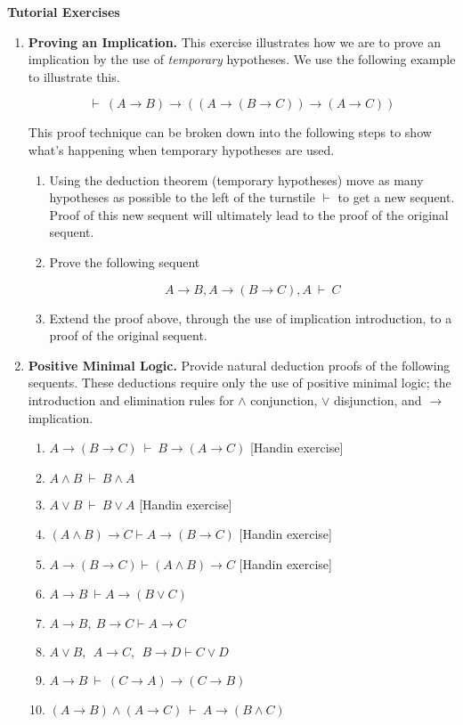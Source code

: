 \documentclass[11pt]{report}
\begin{document}
\newpage
{\bf Tutorial Exercises}
\begin{enumerate}

	\item \textbf{Proving an Implication.} This exercise illustrates how we are to prove an implication by the use of \emph{temporary} hypotheses. We use the following example to illustrate this.
	
	$$\vdash \ (A \to B) \to ((A \to (B \to C)) \to (A \to C))$$

	This proof technique can be broken down into the following steps to show what's happening when temporary hypotheses are used. 

	\begin{enumerate}

		\item Using the deduction theorem (temporary hypotheses) move as many hypotheses as possible to the left of the turnstile $\vdash$ to get a new sequent. Proof of this new sequent will ultimately lead to the proof of the original sequent. 

		\item Prove the following sequent 
		
		$$ A \to B, A \to (B \to C), A \ \vdash \ C$$

		\item Extend the proof above, through the use of implication introduction, to a proof of the original sequent.

	\end{enumerate}
	
	\item \textbf{Positive Minimal Logic.} Provide natural deduction proofs of the following sequents. These deductions require only the use of positive minimal logic; the introduction and elimination rules for $\land$ conjunction, $\lor$ disjunction, and $\to$ implication. 
	 
	\begin{enumerate}
		\item $A \to (B \to C) \ \vdash \ B \to (A \to C)$ \hfill [Handin exercise]
		\item $A \land B \ \vdash \ B \land A$
		\item $A \lor B \ \vdash \ B \lor A$ \hfill [Handin exercise]
		\item $( A\land  B) \rightarrow  C \vdash  A\rightarrow ( B \rightarrow  C) $ \hfill [Handin exercise]
		\item $A \rightarrow ( B \rightarrow  C) \vdash ( A\land  B) \rightarrow C$	 \hfill [Handin exercise]
		\item $A \to B \ \vdash A \to (B \lor C)$
		\item $ A\rightarrow  B, \  B \rightarrow  C \vdash  A\rightarrow  C $
		\item $ A\lor  B,\ \  A\to  C,\ \  B \to  D \vdash   C \lor  D$		
		\item $A \to B \ \vdash \ (C \to A) \to (C \to B)$	
		\item $(A \to B) \land (A \to C) \ \vdash \ A \to (B \land C)$
	\end{enumerate}	


\end{enumerate}
\end{document}
